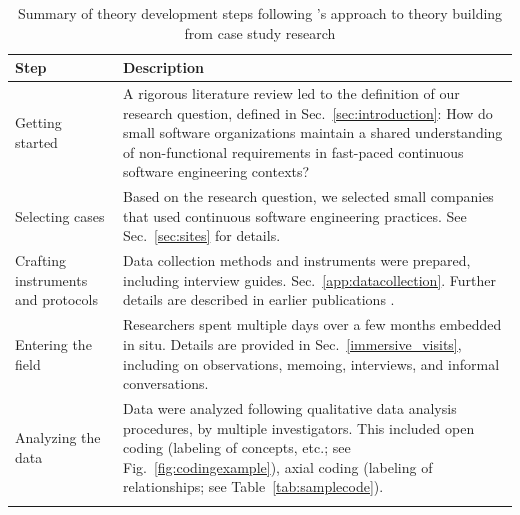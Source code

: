 \documentclass[smallextended]{svjour3}
\begin{document}
\begin{table}[!h]
    \centering
    \caption{Summary of theory development steps following \citet{eisenhardt1989building}'s approach to theory building from case study research}
    \label{tab:theorizing}

\begin{tabular}{P{2cm}p{9.6cm}}

\toprule 
Step & Description \\
\midrule 

Getting started & A rigorous literature review led to the definition of our research question, defined in Sec.~\ref{sec:introduction}:  How do small software organizations maintain a shared understanding of non-functional requirements in fast-paced continuous software engineering contexts? \\

\addlinespace

Selecting cases & Based on the research question, we selected small companies that used continuous software engineering practices. See Sec.~\ref{sec:sites} for details. \\

\addlinespace

Crafting instruments and protocols & Data collection methods and instruments were prepared, including interview guides. Sec.~\ref{app:datacollection}. Further details are described in earlier publications \citep{werner2020re,werner_tse_2021,okpara_re2022,okpara_rej2023}.\\

\addlinespace

Entering the field & Researchers spent multiple days over a few months embedded in situ. Details are provided in Sec.~\ref{immersive_visits}, including on observations, memoing, interviews, and informal conversations.\\


\addlinespace

Analyzing the data & Data were analyzed following qualitative data analysis procedures, by multiple investigators. This included open coding (labeling of concepts, etc.; see Fig.~\ref{fig:codingexample}), axial coding (labeling of relationships; see Table~\ref{tab:samplecode}). \\

\addlinespace


\end{tabular}
\end{table}
\end{document}
